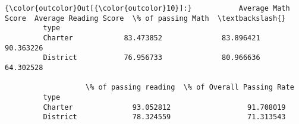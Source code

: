 \documentclass[11pt]{article}
\begin{document}
\begin{Verbatim}[commandchars=\\\{\}]
{\color{outcolor}Out[{\color{outcolor}10}]:}           Average Math Score  Average Reading Score  \% of passing Math  \textbackslash{}
         type                                                                     
         Charter            83.473852              83.896421          90.363226   
         District           76.956733              80.966636          64.302528   
         
                   \% of passing reading  \% of Overall Passing Rate  
         type                                                       
         Charter              93.052812                  91.708019  
         District             78.324559                  71.313543  
\end{Verbatim}
            

    
    
    
    
\end{document}
